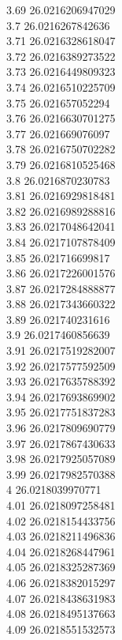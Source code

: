 {3.69	26.0216206947029\\
3.7	26.0216267842636\\
3.71	26.0216328618047\\
3.72	26.0216389273522\\
3.73	26.0216449809323\\
3.74	26.0216510225709\\
3.75	26.021657052294\\
3.76	26.0216630701275\\
3.77	26.021669076097\\
3.78	26.0216750702282\\
3.79	26.0216810525468\\
3.8	26.0216870230783\\
3.81	26.0216929818481\\
3.82	26.0216989288816\\
3.83	26.0217048642041\\
3.84	26.0217107878409\\
3.85	26.021716699817\\
3.86	26.0217226001576\\
3.87	26.0217284888877\\
3.88	26.0217343660322\\
3.89	26.021740231616\\
3.9	26.0217460856639\\
3.91	26.0217519282007\\
3.92	26.0217577592509\\
3.93	26.0217635788392\\
3.94	26.0217693869902\\
3.95	26.0217751837283\\
3.96	26.0217809690779\\
3.97	26.0217867430633\\
3.98	26.0217925057089\\
3.99	26.0217982570388\\
4	26.0218039970771\\
4.01	26.0218097258481\\
4.02	26.0218154433756\\
4.03	26.0218211496836\\
4.04	26.0218268447961\\
4.05	26.0218325287369\\
4.06	26.0218382015297\\
4.07	26.0218438631983\\
4.08	26.0218495137663\\
4.09	26.0218551532573\\
}
